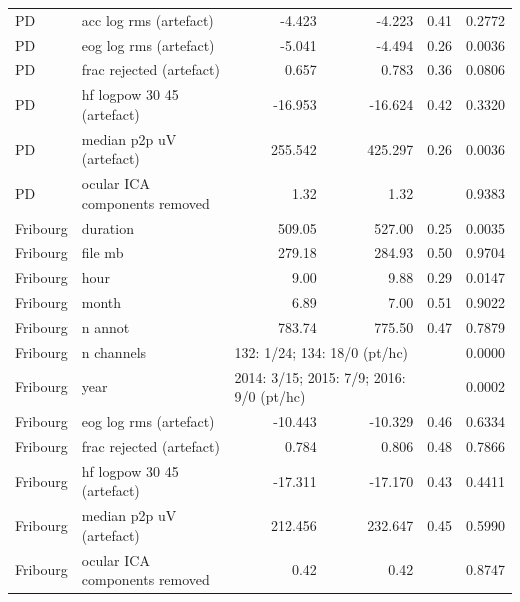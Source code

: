 \documentclass[10pt]{article}
\begin{document}
\begin{longtable}{l l r r r r}
PD & acc log rms (artefact) & -4.423 & -4.223 & 0.41 & 0.2772 \\
PD & eog log rms (artefact) & -5.041 & -4.494 & 0.26 & 0.0036 \\
PD & frac rejected (artefact) & 0.657 & 0.783 & 0.36 & 0.0806 \\
PD & hf logpow 30 45 (artefact) & -16.953 & -16.624 & 0.42 & 0.3320 \\
PD & median p2p uV (artefact) & 255.542 & 425.297 & 0.26 & 0.0036 \\
PD & ocular ICA components removed & 1.32 & 1.32 & & 0.9383 \\
\midrule
Fribourg & duration & 509.05 & 527.00 & 0.25 & 0.0035 \\
Fribourg & file mb & 279.18 & 284.93 & 0.50 & 0.9704 \\
Fribourg & hour & 9.00 & 9.88 & 0.29 & 0.0147 \\
Fribourg & month & 6.89 & 7.00 & 0.51 & 0.9022 \\
Fribourg & n annot & 783.74 & 775.50 & 0.47 & 0.7879 \\
Fribourg & n channels & \multicolumn{2}{l}{132: 1/24; 134: 18/0 (pt/hc)} & & 0.0000 \\
Fribourg & year & \multicolumn{2}{l}{2014: 3/15; 2015: 7/9; 2016: 9/0 (pt/hc)} & & 0.0002 \\
Fribourg & eog log rms (artefact) & -10.443 & -10.329 & 0.46 & 0.6334 \\
Fribourg & frac rejected (artefact) & 0.784 & 0.806 & 0.48 & 0.7866 \\
Fribourg & hf logpow 30 45 (artefact) & -17.311 & -17.170 & 0.43 & 0.4411 \\
Fribourg & median p2p uV (artefact) & 212.456 & 232.647 & 0.45 & 0.5990 \\
Fribourg & ocular ICA components removed & 0.42 & 0.42 & & 0.8747 \\
\bottomrule
\end{longtable}
\end{document}
